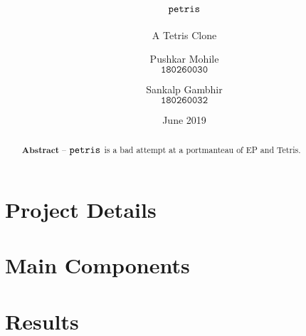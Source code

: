\documentclass[10pt, a4paper, egregdoesnotlikesansseriftitles]{scrartcl}
\title{$\texttt{petris}$}
\subtitle{A Tetris Clone}
\author{
    Pushkar Mohile \\
    $\texttt{180260030}$
    \and
    Sankalp Gambhir \\
    $\texttt{180260032}$
    }
\date{June 2019}
\begin{document}
\maketitle

\begin{abstract}
    \centering
    $\textbf{Abstract --}$
    $\texttt{petris}$ is a bad attempt at a portmanteau of 
    EP and Tetris.
\end{abstract}


\section{Project Details}


\section{Main Components}


\section{Results}

\end{document}
